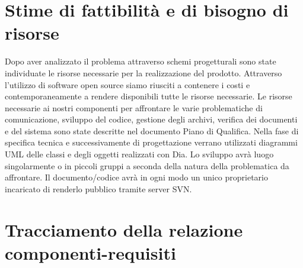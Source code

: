 \documentclass[11pt,titlepage,a4paper]{report}
\begin{document}
\chapter{Stime di fattibilit\`a e di bisogno di risorse}
Dopo aver analizzato il problema attraverso schemi progetturali sono state individuate le risorse necessarie  per la realizzazione del prodotto. Attraverso l'utilizzo di software open source siamo riusciti a contenere i costi e contemporaneamente a rendere disponibili tutte le risorse necessarie.
Le risorse necessarie ai nostri componenti per affrontare le varie problematiche di comunicazione, sviluppo del codice, gestione degli archivi, verifica dei documenti e del sistema sono state descritte nel documento Piano di Qualifica. Nella fase di specifica tecnica e successivamente di progettazione verrano utilizzati diagrammi UML delle classi e degli oggetti realizzati con Dia. Lo sviluppo avr\`a luogo singolarmente o in piccoli gruppi a seconda della natura della problematica da affrontare. Il documento/codice avr\`a in ogni modo un unico proprietario incaricato di renderlo pubblico tramite server SVN.

\chapter{Tracciamento della relazione componenti-requisiti}
\end{document}
